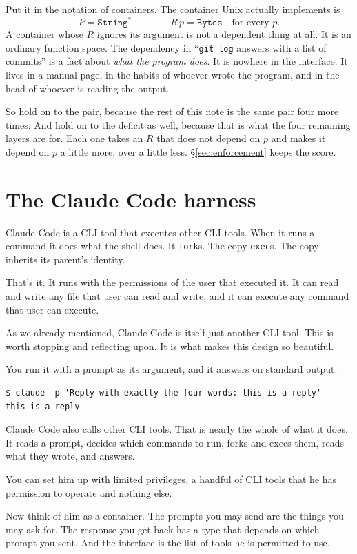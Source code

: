 \documentclass[11pt,a4paper]{article}
\begin{document}
Put it in the notation of containers. The container Unix actually implements is
\[
  P = \texttt{String}^{*} \qquad\qquad R\,p = \texttt{Bytes} \quad\text{for every } p .
\]
A container whose $R$ ignores its argument is not a dependent thing at all. It is an ordinary
function space. The dependency in ``\texttt{git log} answers with a list of commits'' is a fact
about \emph{what the program does}. It is nowhere in the interface. It lives in a manual page, in
the habits of whoever wrote the program, and in the head of whoever is reading the output.

So hold on to the pair, because the rest of this note is the same pair four more times. And hold on
to the deficit as well, because that is what the four remaining layers are for. Each one takes an
$R$ that does not depend on $p$ and makes it depend on $p$ a little more, over a little less.
§\ref{sec:enforcement} keeps the score.

\newpage

\section{The Claude Code harness}
\label{sec:harness}

\begin{sectionbox}
Claude Code is a CLI tool that executes other CLI tools. When it runs a command it does what the
shell does. It
\texttt{fork}s. The copy \texttt{exec}s. The copy inherits its parent's identity.

That's it. It runs with the permissions of the user that executed it. It can read and write any
file that user can read and write, and it can execute any command that user can execute.

As we already mentioned, Claude Code is itself just another CLI tool. This is worth stopping and
reflecting upon. It is what makes this design so beautiful.

You run it with a prompt as its argument, and it answers on standard output.

\begin{lstlisting}[language=SH]
$ claude -p 'Reply with exactly the four words: this is a reply'
this is a reply
\end{lstlisting}

Claude Code also calls other CLI tools. That is nearly the whole of what it does. It reads a
prompt, decides which commands to run, forks and execs them, reads what they wrote, and answers.

You can set him up with limited privileges, a handful of CLI tools that he has permission to
operate and nothing else.

Now think of him as a container. The prompts you may send are the things you may ask for. The response
you get back has a type that depends on which prompt you sent. And the interface is the list of
tools he is permitted to use.
\end{sectionbox}
\end{document}
